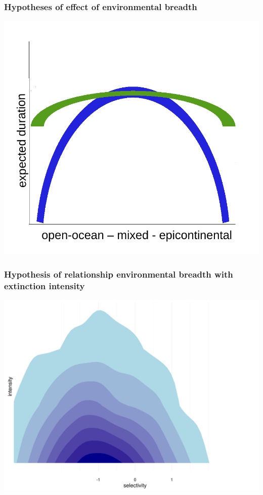 \documentclass{beamer}
\begin{document}
\begin{frame}
  \frametitle{Hypotheses of effect of environmental breadth}
  \begin{center}
    \includegraphics[width = \textwidth,height = 0.8\textheight,keepaspectratio = true]{figure/selection_breadth}
  \end{center}
\end{frame}

\begin{frame}
  \frametitle{Hypothesis of relationship environmental breadth with extinction intensity}
  \begin{center}
    \includegraphics[width = \textwidth,height = 0.8\textheight,keepaspectratio = true]{figure/cur_hypo}
  \end{center}
\end{frame}
\end{document}
